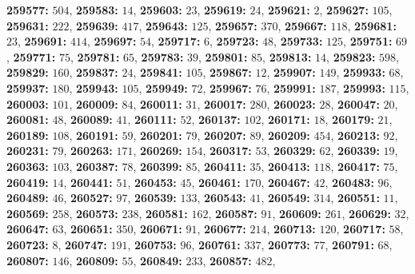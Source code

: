 \textsf{\bfseries 259577:} $504$, \textsf{\bfseries 259583:} $14$, \textsf{\bfseries 259603:} $23$, \textsf{\bfseries 259619:} $24$, \textsf{\bfseries 259621:} $2$, \textsf{\bfseries 259627:} $105$, \textsf{\bfseries 259631:} $222$, \textsf{\bfseries 259639:} $417$, \textsf{\bfseries 259643:} $125$, \textsf{\bfseries 259657:} $370$, \textsf{\bfseries 259667:} $118$, \textsf{\bfseries 259681:} $23$, \textsf{\bfseries 259691:} $414$, \textsf{\bfseries 259697:} $54$, \textsf{\bfseries 259717:} $6$, \textsf{\bfseries 259723:} $48$, \textsf{\bfseries 259733:} $125$, \textsf{\bfseries 259751:} $69$, \textsf{\bfseries 259771:} $75$, \textsf{\bfseries 259781:} $65$, \textsf{\bfseries 259783:} $39$, \textsf{\bfseries 259801:} $85$, \textsf{\bfseries 259813:} $14$, \textsf{\bfseries 259823:} $598$, \textsf{\bfseries 259829:} $160$, \textsf{\bfseries 259837:} $24$, \textsf{\bfseries 259841:} $105$, \textsf{\bfseries 259867:} $12$, \textsf{\bfseries 259907:} $149$, \textsf{\bfseries 259933:} $68$, \textsf{\bfseries 259937:} $180$, \textsf{\bfseries 259943:} $105$, \textsf{\bfseries 259949:} $72$, \textsf{\bfseries 259967:} $76$, \textsf{\bfseries 259991:} $187$, \textsf{\bfseries 259993:} $115$, \textsf{\bfseries 260003:} $101$, \textsf{\bfseries 260009:} $84$, \textsf{\bfseries 260011:} $31$, \textsf{\bfseries 260017:} $280$, \textsf{\bfseries 260023:} $28$, \textsf{\bfseries 260047:} $20$, \textsf{\bfseries 260081:} $48$, \textsf{\bfseries 260089:} $41$, \textsf{\bfseries 260111:} $52$, \textsf{\bfseries 260137:} $102$, \textsf{\bfseries 260171:} $18$, \textsf{\bfseries 260179:} $21$, \textsf{\bfseries 260189:} $108$, \textsf{\bfseries 260191:} $59$, \textsf{\bfseries 260201:} $79$, \textsf{\bfseries 260207:} $89$, \textsf{\bfseries 260209:} $454$, \textsf{\bfseries 260213:} $92$, \textsf{\bfseries 260231:} $79$, \textsf{\bfseries 260263:} $171$, \textsf{\bfseries 260269:} $154$, \textsf{\bfseries 260317:} $53$, \textsf{\bfseries 260329:} $62$, \textsf{\bfseries 260339:} $19$, \textsf{\bfseries 260363:} $103$, \textsf{\bfseries 260387:} $78$, \textsf{\bfseries 260399:} $85$, \textsf{\bfseries 260411:} $35$, \textsf{\bfseries 260413:} $118$, \textsf{\bfseries 260417:} $75$, \textsf{\bfseries 260419:} $14$, \textsf{\bfseries 260441:} $51$, \textsf{\bfseries 260453:} $45$, \textsf{\bfseries 260461:} $170$, \textsf{\bfseries 260467:} $42$, \textsf{\bfseries 260483:} $96$, \textsf{\bfseries 260489:} $46$, \textsf{\bfseries 260527:} $97$, \textsf{\bfseries 260539:} $133$, \textsf{\bfseries 260543:} $41$, \textsf{\bfseries 260549:} $314$, \textsf{\bfseries 260551:} $11$, \textsf{\bfseries 260569:} $258$, \textsf{\bfseries 260573:} $238$, \textsf{\bfseries 260581:} $162$, \textsf{\bfseries 260587:} $91$, \textsf{\bfseries 260609:} $261$, \textsf{\bfseries 260629:} $32$, \textsf{\bfseries 260647:} $63$, \textsf{\bfseries 260651:} $350$, \textsf{\bfseries 260671:} $91$, \textsf{\bfseries 260677:} $214$, \textsf{\bfseries 260713:} $120$, \textsf{\bfseries 260717:} $58$, \textsf{\bfseries 260723:} $8$, \textsf{\bfseries 260747:} $191$, \textsf{\bfseries 260753:} $96$, \textsf{\bfseries 260761:} $337$, \textsf{\bfseries 260773:} $77$, \textsf{\bfseries 260791:} $68$, \textsf{\bfseries 260807:} $146$, \textsf{\bfseries 260809:} $55$, \textsf{\bfseries 260849:} $233$, \textsf{\bfseries 260857:} $482$, 
